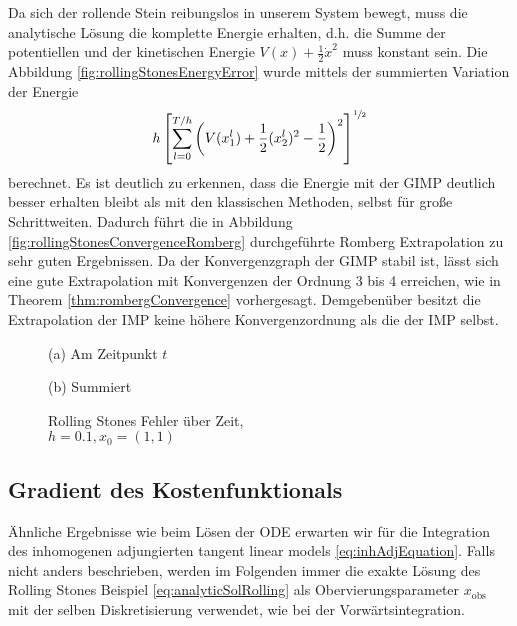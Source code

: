 Da sich der rollende Stein reibungslos in unserem System bewegt, muss die analytische Lösung die komplette Energie erhalten, d.h. die Summe der potentiellen und der kinetischen Energie $V(x) + \frac{1}{2}\dot x^2$ muss konstant sein. Die Abbildung \ref{fig:rollingStonesEnergyError} wurde mittels der summierten Variation der Energie 
\begin{equation}
 h \left[\sum_{l=0}^{T/h} \left( V(x_1^l) + \frac{1}{2} (x_2^l)^2 -\frac{1}{2}\right)^2\right]^{\sfrac{1}{2}}
 \label{eq:energyVariation}
\end{equation}
berechnet. Es ist deutlich zu erkennen, dass die Energie mit der GIMP deutlich besser erhalten bleibt als mit den klassischen Methoden, selbst für große Schrittweiten.
Dadurch führt die in Abbildung \ref{fig:rollingStonesConvergenceRomberg} durchgeführte Romberg Extrapolation zu sehr guten Ergebnissen. Da der Konvergenzgraph der GIMP stabil ist, lässt sich eine gute Extrapolation mit Konvergenzen der Ordnung 3 bis 4 erreichen, wie in Theorem \ref{thm:rombergConvergence} vorhergesagt. Demgebenüber besitzt die Extrapolation der IMP keine höhere Konvergenzordnung als die der IMP selbst.
\begin{figure}[H]
\footnotesize 
\centering
\begin{minipage}[b]{0.49\linewidth}

\caption*{(a) Am Zeitpunkt $t$}\end{minipage}
\begin{minipage}[b]{0.49\linewidth}

\caption*{(b) Summiert}
\end{minipage}
\caption{Rolling Stones Fehler über Zeit, \\$h=0.1,x_0=(1,1)$}
\label{fig:rollingStonesEOT}

\end{figure}

\subsection{Gradient des Kostenfunktionals}
Ähnliche Ergebnisse wie beim Lösen der ODE erwarten wir für die Integration des inhomogenen adjungierten tangent linear models \eqref{eq:inhAdjEquation}. Falls nicht anders beschrieben, werden im Folgenden immer die exakte Lösung des Rolling Stones Beispiel \eqref{eq:analyticSolRolling} als Obervierungsparameter $x_{\text{obs}}$ mit der selben Diskretisierung verwendet, wie bei der Vorwärtsintegration.

